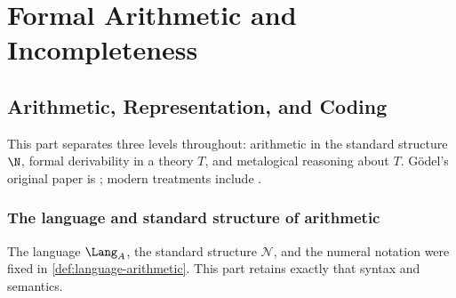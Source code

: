 \part{Formal Arithmetic and Incompleteness}
\label{part:incompleteness}

\chapter{Arithmetic, Representation, and Coding}
\label{ch:arithmetic-coding}

This part separates three levels throughout: arithmetic in the standard
structure \(\N\), formal derivability in a theory \(T\), and metalogical
reasoning about \(T\).  G\"odel's original paper is \cite{Godel1931}; modern
treatments include \cite{Shoenfield1967,BoolosBurgessJeffrey2007}.

\section{The language and standard structure of arithmetic}
\label{sec:arithmetic-coding-01}

The language \(\Lang_A\), the standard structure \(\mathcal N\), and the
numeral notation were fixed
in \cref{def:language-arithmetic}.  This part retains exactly that syntax and
semantics.

